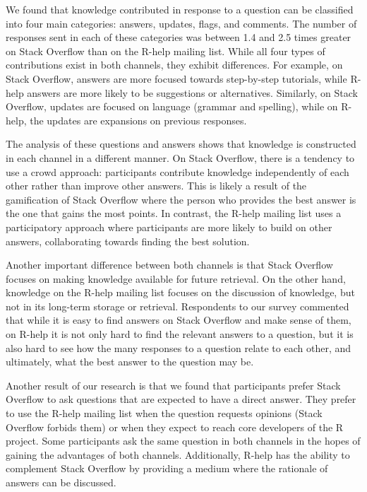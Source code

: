 \documentclass[smallextended]{svjour3}       %
\newcommand{\SO}{Stack Overflow\xspace}
\newcommand{\RH}{R-help\xspace}
\begin{document}
We found that knowledge contributed in response to a question can be classified into four main categories: answers, updates, flags, and comments. The number of
responses sent in each of these categories was between 1.4 and 2.5 times greater on \SO than on the \RH mailing list. While all four types of contributions exist in both
channels, they exhibit differences. For example, on \SO, answers are more focused towards step-by-step tutorials, while \RH answers are more
likely to be suggestions or alternatives. Similarly, on \SO, updates are focused on language (grammar and spelling), while on \RH, the updates are
expansions on previous responses.

The analysis of these questions and answers shows that knowledge is constructed in each channel in a different manner. On \SO, there is a tendency to use
a crowd approach: participants contribute knowledge independently of each other rather than improve other answers. This is likely a result of the
gamification of \SO where the person who provides the best answer is the one that gains the most points.
In contrast, the \RH mailing list uses a participatory approach where participants are more likely to build on other answers, collaborating towards finding the best solution.

Another important difference between both channels is that \SO focuses on making knowledge available for future retrieval. On the other hand, knowledge on the \RH mailing list 
focuses on the discussion of knowledge, but not in its long-term storage or retrieval. Respondents to our survey commented that while it is easy to find answers on \SO
and make sense of them, on \RH it is not only hard to find the relevant answers to a question, but it is also hard to see how the many responses to a question
relate to each other, and ultimately, what the best answer to the question may be.

Another result of our research is that we found that participants prefer \SO to ask questions that are expected to have a direct answer. They prefer to use the \RH mailing list when the
question requests opinions (\SO forbids them) or when they expect to reach core developers of the R project. Some participants ask the same question in both
channels in the hopes of gaining the advantages of both channels. Additionally, \RH has the ability to complement \SO by providing a medium where the rationale
of answers can be discussed.
\end{document}
